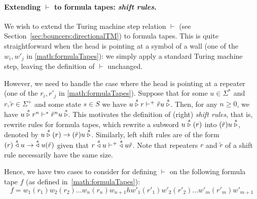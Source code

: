 



\paragraph*{Extending $\vdash$ to formula tapes: \textit{shift rules}.} We wish to extend the Turing machine step relation $\vdash$ (see Section~\ref{sec:bouncers:directionalTM}) to formula tapes. This is quite straightforward when the head is pointing at a symbol of a wall (one of the $w_i, w'_j$ in \eqref{math:formulaTapes}): we simply apply a standard Turing machine step, leaving the definition of $\vdash$ unchanged.

However, we need to handle the case where the head is pointing at a repeater (one of the $r_i, r'_j$ in \eqref{math:formulaTapes}). Suppose that for some $u\in\Sigma^*$ and $r,\tilde{r}\in\Sigma^+$ and some state $s\in S$ we have $u \stackrel{s}\triangleright r \vdash^+ \tilde{r} u \stackrel{s}\triangleright$. Then, for any $n\geq 0$, we have $u \stackrel{s}\triangleright r^n \vdash^* \tilde{r}^n u \stackrel{s}\triangleright$. This motivates the definition of
(right) \textit{shift rules}, that is, rewrite rules for formula tapes, which rewrite a subword $u \stackrel{s}\triangleright(r)$ into $(\tilde{r})u\stackrel{s}\triangleright$, denoted by $u \stackrel{s}\triangleright(r) \to (\tilde{r})u\stackrel{s}\triangleright$. Similarly, left shift rules are of the form $(r)\stackrel{s}\triangleleft u \to \;\stackrel{s}\triangleleft u(\tilde{r})$ given that $r\stackrel{s}\triangleleft u \vdash^+ \;\stackrel{s}\triangleleft u\tilde{r}$. Note that repeaters $r$ and $\tilde{r}$ of a shift rule necessarily have the same size.

Hence, we have two cases to consider for defining $\vdash$ on the following formula tape $f$ (as defined in~\eqref{math:formulaTapes}):
$$f = w_1(r_1)w_2(r_2)\dots w_n(r_n) w_{n+1} h w'_1(r'_1)w'_2(r'_2)\dots w'_m(r'_m) w'_{m+1}$$

